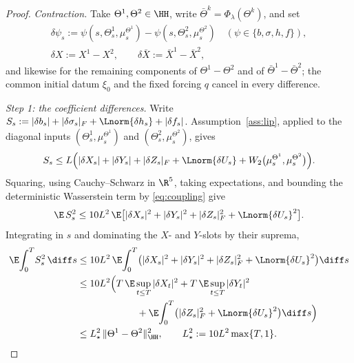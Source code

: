 \begin{proof}
\emph{Contraction.} Take $\Theta^1,\Theta^2\in\HH$, write $\bar\Theta^k=\Phi_\lambda(\Theta^k)$,
and set
\[
\begin{gathered}
\delta\psi_s:=\psi(s,\Theta^1_s,\mu^{\Theta^1}_s)-\psi(s,\Theta^2_s,\mu^{\Theta^2}_s)
\quad(\psi\in\{b,\sigma,h,f\}),\\[0.4ex]
\delta X:=X^1-X^2,\qquad \delta\bar X:=\bar X^1-\bar X^2 ,
\end{gathered}
\]
and likewise for the remaining components of $\Theta^1-\Theta^2$ and of
$\bar\Theta^1-\bar\Theta^2$; the common initial datum $\xi_0$ and
the fixed forcing $q$ cancel in every difference.

\emph{Step 1: the coefficient differences.} Write
$S_s:=|\delta b_s|+|\delta\sigma_s|_F+\Lnorm{\delta h_s}+|\delta f_s|$. Assumption~\ref{ass:lip},
applied to the diagonal inputs $(\Theta^1_s,\mu^{\Theta^1}_s)$ and $(\Theta^2_s,\mu^{\Theta^2}_s)$,
gives
\[
S_s\le L\Big(|\delta X_s|+|\delta Y_s|+|\delta Z_s|_F+\Lnorm{\delta U_s}
+W_2\big(\mu^{\Theta^1}_s,\mu^{\Theta^2}_s\big)\Big) .
\]
Squaring, using Cauchy--Schwarz in $\R^5$, taking expectations, and bounding the deterministic
Wasserstein term by \eqref{eq:coupling} give
\[
\E\,S_s^2\le 10L^2\,\E\big[|\delta X_s|^2+|\delta Y_s|^2+|\delta Z_s|_F^2+\Lnorm{\delta U_s}^2\big].
\]
Integrating in $s$ and dominating the $X$- and $Y$-slots by their suprema,
\begin{equation}\label{eq:coeffdiff}
\begin{aligned}
\E\!\int_0^T\! S_s^2\,\diff s
&\le 10L^2\,\E\!\int_0^T\!\big(|\delta X_s|^2+|\delta Y_s|^2+|\delta Z_s|_F^2+\Lnorm{\delta U_s}^2\big)\diff s\\
&\le 10L^2\Big(T\,\E\sup_{t\le T}|\delta X_t|^2+T\,\E\sup_{t\le T}|\delta Y_t|^2\\
&\hspace{6.2em}+\E\!\int_0^T\!\big(|\delta Z_s|_F^2+\Lnorm{\delta U_s}^2\big)\diff s\Big)\\
&\le L_\star^2\,\|\Theta^1-\Theta^2\|_{\HH}^2 ,
\qquad L_\star^2:=10L^2\max\{T,1\} .
\end{aligned}
\end{equation}


\end{proof}
